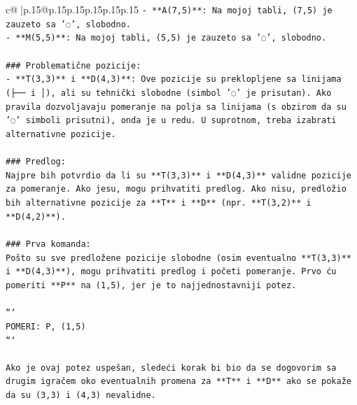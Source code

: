 \documentclass{article}
\begin{document}
{\begin{supertabular}{c@{$\;$}|p{.15\linewidth}@{}p{.15\linewidth}p{.15\linewidth}p{.15\linewidth}p{.15\linewidth}p{.15\linewidth}}
{{{\texttt{{-} **A(7,5)**: Na mojoj tabli, (7,5) je zauzeto sa '◌', slobodno.} \\
\texttt{{-} **M(5,5)**: Na mojoj tabli, (5,5) je zauzeto sa '◌', slobodno.} \\
\\ 
\texttt{\#\#\# Problematične pozicije:} \\
\texttt{{-} **T(3,3)** i **D(4,3)**: Ove pozicije su preklopljene sa linijama (├── i │), ali su tehnički slobodne (simbol '◌' je prisutan). Ako pravila dozvoljavaju pomeranje na polja sa linijama (s obzirom da su '◌' simboli prisutni), onda je u redu. U suprotnom, treba izabrati alternativne pozicije.} \\
\\ 
\texttt{\#\#\# Predlog:} \\
\texttt{Najpre bih potvrdio da li su **T(3,3)** i **D(4,3)** validne pozicije za pomeranje. Ako jesu, mogu prihvatiti predlog. Ako nisu, predložio bih alternativne pozicije za **T** i **D** (npr. **T(3,2)** i **D(4,2)**).} \\
\\ 
\texttt{\#\#\# Prva komanda:} \\
\texttt{Pošto su sve predložene pozicije slobodne (osim eventualno **T(3,3)** i **D(4,3)**), mogu prihvatiti predlog i početi pomeranje. Prvo ću pomeriti **P** na (1,5), jer je to najjednostavniji potez.} \\
\\ 
\texttt{```} \\
\texttt{POMERI: P, (1,5)} \\
\texttt{```} \\
\\ 
\texttt{Ako je ovaj potez uspešan, sledeći korak bi bio da se dogovorim sa drugim igračem oko eventualnih promena za **T** i **D** ako se pokaže da su (3,3) i (4,3) nevalidne.} \\
            }
        }
    }
     \\ \\


\end{supertabular}}
\end{document}
